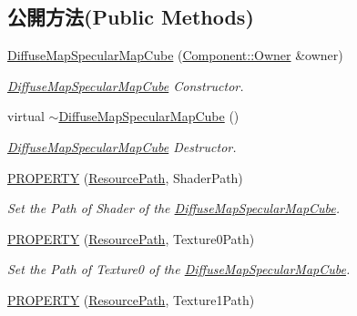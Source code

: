 \subsection*{公開方法(Public Methods)}
\begin{DoxyCompactItemize}
\item 
\hyperlink{class_i_dream_sky_1_1_diffuse_map_specular_map_cube_adaa353296be9f47b4df863e4759716df}{Diffuse\+Map\+Specular\+Map\+Cube} (\hyperlink{class_i_dream_sky_1_1_component_1_1_owner}{Component\+::\+Owner} \&owner)
\begin{DoxyCompactList}\small\item\em \hyperlink{class_i_dream_sky_1_1_diffuse_map_specular_map_cube}{Diffuse\+Map\+Specular\+Map\+Cube} Constructor. \end{DoxyCompactList}\item 
virtual \hyperlink{class_i_dream_sky_1_1_diffuse_map_specular_map_cube_a723855f16958025f5fefdb679df736d1}{$\sim$\+Diffuse\+Map\+Specular\+Map\+Cube} ()
\begin{DoxyCompactList}\small\item\em \hyperlink{class_i_dream_sky_1_1_diffuse_map_specular_map_cube}{Diffuse\+Map\+Specular\+Map\+Cube} Destructor. \end{DoxyCompactList}\item 
\hyperlink{class_i_dream_sky_1_1_diffuse_map_specular_map_cube_a441a83957af11d1e64e056da702786d7}{P\+R\+O\+P\+E\+R\+TY} (\hyperlink{class_i_dream_sky_1_1_resource_path}{Resource\+Path}, Shader\+Path)
\begin{DoxyCompactList}\small\item\em Set the Path of Shader of the \hyperlink{class_i_dream_sky_1_1_diffuse_map_specular_map_cube}{Diffuse\+Map\+Specular\+Map\+Cube}. \end{DoxyCompactList}\item 
\hyperlink{class_i_dream_sky_1_1_diffuse_map_specular_map_cube_ab435ea34bb50263fcf5a1dd517923381}{P\+R\+O\+P\+E\+R\+TY} (\hyperlink{class_i_dream_sky_1_1_resource_path}{Resource\+Path}, Texture0\+Path)
\begin{DoxyCompactList}\small\item\em Set the Path of Texture0 of the \hyperlink{class_i_dream_sky_1_1_diffuse_map_specular_map_cube}{Diffuse\+Map\+Specular\+Map\+Cube}. \end{DoxyCompactList}\item 
\hyperlink{class_i_dream_sky_1_1_diffuse_map_specular_map_cube_aa28667335ab116eed2f2a83c739641eb}{P\+R\+O\+P\+E\+R\+TY} (\hyperlink{class_i_dream_sky_1_1_resource_path}{Resource\+Path}, Texture1\+Path)

\end{DoxyCompactItemize}
